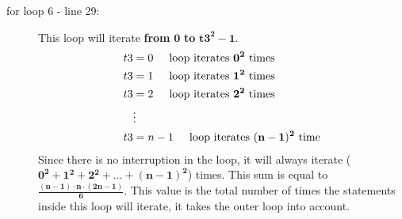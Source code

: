 \documentclass[10pt]{article}
\begin{document}
\begin{description}
\item[for loop 6 - line 29:] This loop will iterate \textbf{from} $\mathbf{0}$ \textbf{to} $\mathbf{t3^2-1}$. 
    \begin{align*}
    t3 &= 0 \text{\hspace{0.5cm}loop iterates $\mathbf{0^{2}}$ times} \\
    t3 &= 1 \text{\hspace{0.5cm}loop iterates $\mathbf{1^{2}}$ times}\\
    t3 &= 2 \text{\hspace{0.5cm}loop iterates  $\mathbf{2^{2}}$ times}\\
    &\vdots \\
    t3 &= n - 1 \text{\hspace{0.5cm}loop iterates $\mathbf{(n-1)^{2}}$ time} \\
    \end{align*}
Since there is no interruption in the loop, it will always iterate ($\mathbf{0^2 +1^2 + 2^2 + ... + (n -1)^2}$) times. This sum is equal to $\mathbf{\frac{(n-1) \cdot n \cdot (2n-1) } {6} }$. This value is the total number of times the statements inside this loop will iterate, it takes the outer loop into account. \par
\end{description}
\end{document}
